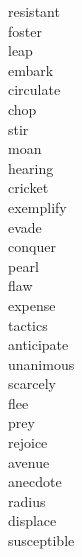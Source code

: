 \documentclass[b5paper, 11pt]{ctexart}
\begin{document}
\begin{multicols*}{3}
\begin{description}
\item[resistant]

\item[foster]

\item[leap]

\item[embark]

\item[circulate]

\item[chop]

\item[stir]

\item[moan]

\item[hearing]

\item[cricket]

\item[exemplify]

\item[evade]

\item[conquer]

\item[pearl]

\item[flaw]

\item[expense]

\item[tactics]

\item[anticipate]

\item[unanimous]

\item[scarcely]

\item[flee]

\item[prey]

\item[rejoice]

\item[avenue]

\item[anecdote]

\item[radius]

\item[displace]

\item[susceptible]


\end{description}
\end{multicols*}
\end{document}
